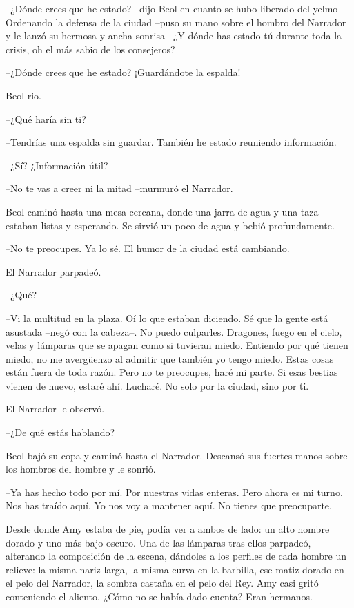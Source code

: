 {--¿Dónde crees que he estado? --dijo Beol en cuanto se hubo liberado
	del yelmo-- Ordenando la defensa de la ciudad --puso su mano sobre el
	hombro del Narrador y le lanzó su hermosa y ancha sonrisa-- ¿Y dónde has
estado tú durante toda la crisis, oh el más sabio de los consejeros?}

{--¿Dónde crees que he estado? ¡Guardándote la espalda!}

{Beol rio.}

{--¿Qué haría sin ti?}

{--Tendrías una espalda sin guardar. También he estado reuniendo
información.}

{--¿Sí? ¿Información útil?}

{--No te vas a creer ni la mitad --murmuró el Narrador.}

{Beol caminó hasta una mesa cercana, donde una jarra de agua y una taza
	estaban listas y esperando. Se sirvió un poco de agua y bebió
profundamente.}

{--No te preocupes. Ya lo sé. El humor de la ciudad está cambiando.}

{El Narrador parpadeó.}

{--¿Qué?}

{--Vi la multitud en la plaza. Oí lo que estaban diciendo. Sé que la
	gente está asustada --negó con la cabeza--. No puedo culparles.
	Dragones, fuego en el cielo, velas y lámparas que se apagan como si
	tuvieran miedo. Entiendo por qué tienen miedo, no me avergüenzo al
	admitir que también yo tengo miedo. Estas cosas están fuera de toda
	razón. Pero no te preocupes, haré mi parte. Si esas bestias vienen de
nuevo, estaré ahí. Lucharé. No solo por la ciudad, sino por ti.}

{El Narrador le observó.}

{--¿De qué estás hablando?}

{Beol bajó su copa y caminó hasta el Narrador. Descansó sus fuertes
manos sobre los hombros del hombre y le sonrió.}

{--Ya has hecho todo por mí. Por nuestras vidas enteras. Pero ahora es
	mi turno. Nos has traído aquí. Yo nos voy a mantener aquí. No tienes que
preocuparte.}

{Desde donde Amy estaba de pie, podía ver a ambos de lado: un alto
	hombre dorado y uno más bajo oscuro. Una de las lámparas tras ellos
	parpadeó, alterando la composición de la escena, dándoles a los perfiles
	de cada hombre un relieve: la misma nariz larga, la misma curva en la
	barbilla, ese matiz dorado en el pelo del Narrador, la sombra castaña en
	el pelo del Rey. Amy casi gritó conteniendo el aliento. ¿Cómo no se
había dado cuenta? Eran hermanos.}

